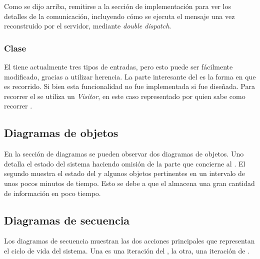           Como se dijo arriba, remitirse a la secci\'on de implementaci\'on para ver
          los detalles de la comunicaci\'on, incluyendo c\'omo se ejecuta el mensaje
          una vez reconstruido por el servidor, mediante \textit{double dispatch}.

      \subsubsection{Clase \historial{}}
          El \historial{} tiene actualmente tres tipos de entradas, pero esto puede
          ser f\'acilmente modificado, gracias a utilizar herencia.
          La parte interesante del \historial{} es la forma en que es recorrido.
          Si bien esta funcionalidad no fue implementada si fue dise\~nada.
          Para recorrer el \historial{} se utiliza un \textit{Visitor}, en este caso
          representado por \recopilador{} quien sabe como recorrer \historial{}.



  \subsection{Diagramas de objetos}
    En la secci\'on de diagramas se pueden observar dos diagramas de objetos.
    Uno detalla el estado del sistema haciendo omisi\'on de la parte que concierne
    al \historial{}.
    El segundo muestra el estado del \historial{} y algunos objetos pertinentes
    en un intervalo de unos pocos minutos de tiempo. Esto se debe a que el
    \historial{} almacena una gran cantidad de informaci\'on en poco tiempo.

  \subsection{Diagramas de secuencia}
    Los diagramas de secuencia muestran las dos acciones principales que
    representan el ciclo de vida del sistema.
    Una es una iteraci\'on del \decisiones{}, la otra, una iteraci\'on de \condiciones{}.
